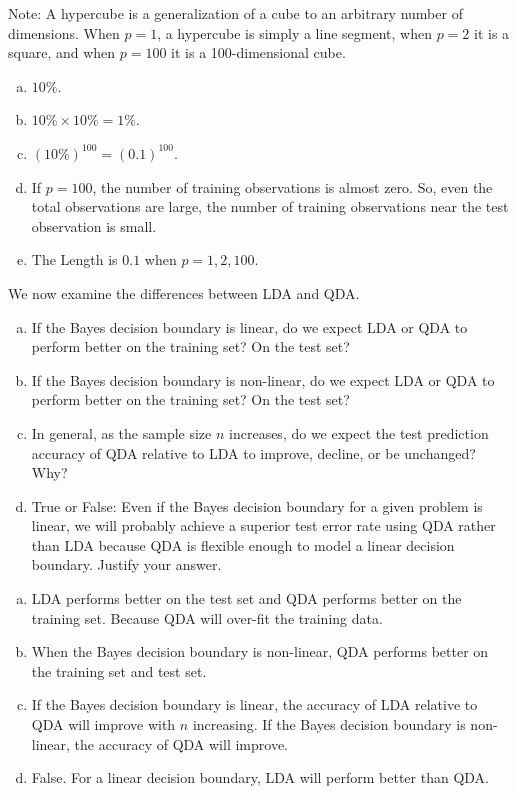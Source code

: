 \documentclass[14pt]{elegantbook}
\begin{document}
\begin{exercise*}[4.4]
\begin{enumerate}[(a)]
    Note: A hypercube is a generalization of a cube to an arbitrary number of dimensions. When $p = 1$, a hypercube is simply a line segment, when $p = 2$ it is a square, and when $p = 100$ it is a 100-dimensional cube. 
  \end{enumerate}
\end{exercise*}

\begin{solution}
  \begin{enumerate}[(a)]
    \item $10\%$. 
    \item $10\%\times 10\%=1\%$. 
    \item $(10\%)^{100}=(0.1)^{100}$. 
    \item If $p=100$, the number of training observations is almost zero. So, even the total observations are large, the number of training observations near the test observation is small. 
    \item The Length is $0.1$ when $p=1,2,100$. 
  \end{enumerate}
\end{solution}

\begin{exercise*}[4.5]
  We now examine the differences between LDA and QDA. 
  \begin{enumerate}[(a)]
    \item If the Bayes decision boundary is linear, do we expect LDA or QDA to perform better on the training set? On the test set? 
    \item If the Bayes decision boundary is non-linear, do we expect LDA or QDA to perform better on the training set? On the test set?
    \item In general, as the sample size $n$ increases, do we expect the test prediction accuracy of QDA relative to LDA to improve, decline, or be unchanged? Why?
    \item True or False: Even if the Bayes decision boundary for a given problem is linear, we will probably achieve a superior test error rate using QDA rather than LDA because QDA is flexible enough to model a linear decision boundary. Justify your answer. 
  \end{enumerate}
\end{exercise*}

\begin{solution}
  \begin{enumerate}[(a)]
    \item LDA performs better on the test set and QDA performs better on the training set. Because QDA will over-fit the training data.
    \item When the Bayes decision boundary is non-linear, QDA performs better on the training set and test set.
    \item If the Bayes decision boundary is linear, the accuracy of LDA relative to QDA will improve with $n$ increasing. If the Bayes decision boundary is non-linear, the accuracy of QDA will improve. 
    \item False. For a linear decision boundary, LDA will perform better than QDA. 
  \end{enumerate}
\end{solution}
\end{document}
